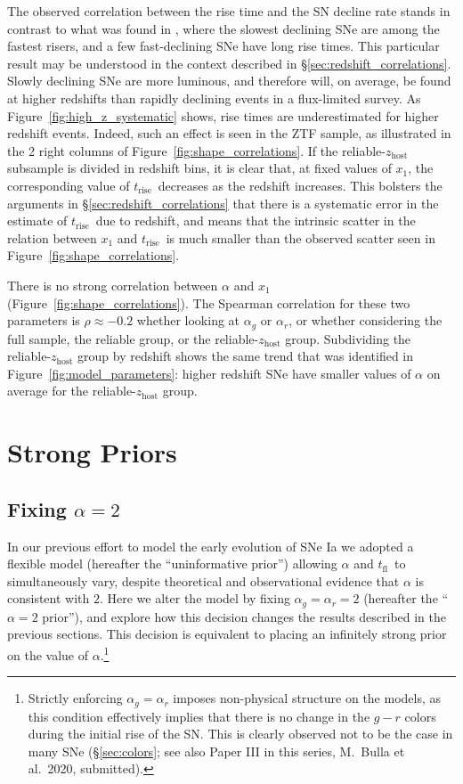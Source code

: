 \documentclass[twocolumn]{aastex63}
\newcommand{\tfl}{$t_\mathrm{fl}$}
\newcommand{\trise}{$t_\mathrm{rise}$}
\begin{document}
The observed correlation between the rise time and the SN decline rate stands
in contrast to what was found in \citet{Hayden10}, where the slowest declining
SNe are among the fastest risers, and a few fast-declining SNe have long rise
times. This particular result may be understood in the context described in
\S\ref{sec:redshift_correlations}. Slowly declining SNe are more luminous, and
therefore will, on average, be found at higher redshifts than rapidly
declining events in a flux-limited survey. As
Figure~\ref{fig:high_z_systematic} shows, rise times are underestimated for
higher redshift events. Indeed, such an effect is seen in the ZTF sample, as
illustrated in the 2 right columns of Figure~\ref{fig:shape_correlations}. If
the reliable-$z_\mathrm{host}$ subsample is divided in redshift bins, it is
clear that, at fixed values of $x_1$, the corresponding value of \trise\
decreases as the redshift increases. This bolsters the arguments in
\S\ref{sec:redshift_correlations} that there is a systematic error in the
estimate of \trise\ due to redshift, and means that the intrinsic scatter in
the relation between $x_1$ and \trise\ is much smaller than the observed
scatter seen in Figure~\ref{fig:shape_correlations}.

There is no strong correlation between $\alpha$ and $x_1$
(Figure~\ref{fig:shape_correlations}). The Spearman correlation for these two
parameters is $\rho \approx -0.2$ whether looking at $\alpha_g$ or $\alpha_r$,
or whether considering the full sample, the reliable group, or the
reliable-$z_\mathrm{host}$ group. Subdividing the reliable-$z_\mathrm{host}$
group by redshift shows the same trend that was identified in
Figure~\ref{fig:model_parameters}: higher redshift SNe have smaller values of
$\alpha$ on average for the reliable-$z_\mathrm{host}$ group.

\section{Strong Priors}\label{sec:strong_priors}

\subsection{Fixing $\alpha = 2$}

In our previous effort to model the early evolution of SNe Ia we adopted a
flexible model (hereafter the ``uninformative prior'') allowing $\alpha$ and
\tfl\ to simultaneously vary, despite theoretical \citep{Arnett82,Riess99a} and
observational \citep{Conley06,Hayden10,Ganeshalingam11} evidence that $\alpha$
is consistent with $2$. Here we alter the model by fixing $\alpha_g = \alpha_r
= 2$ (hereafter the ``$\alpha = 2$ prior''), and explore how this decision
changes the results described in the previous sections. This decision is
equivalent to placing an infinitely strong prior on the value of
$\alpha$.\footnote{Strictly enforcing $\alpha_g = \alpha_r$ imposes
non-physical structure on the models, as this condition effectively implies
that there is no change in the $g - r$ colors during the initial rise of the
SN. This is clearly observed not to be the case in many SNe
(\S\ref{sec:colors}; see also Paper III in this series, M.~Bulla et al.\ 2020,
submitted).}
\end{document}
